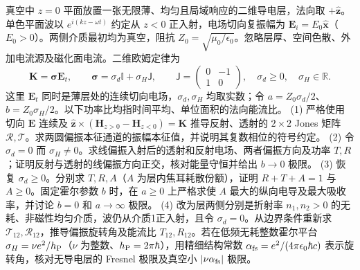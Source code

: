 真空中 \(z=0\) 平面放置一张无限薄、均匀且局域响应的二维导电层，法向取 \(+\hat{\mathbf z}\)。单色平面波以 \(e^{i(kz-\omega t)}\) 约定从 \(z<0\) 正入射，电场切向复振幅为 \(\mathbf E_i=E_0\hat{\mathbf x}\)（\(E_0>0\)）。两侧介质最初均为真空，阻抗 \(Z_0=\sqrt{\mu_0/\epsilon_0}\)。忽略层厚、空间色散、外加电流源及磁化面电流。二维欧姆定律为
\[
\mathbf K=\boldsymbol{\sigma}\mathbf E_t,\qquad
\boldsymbol{\sigma}=\sigma_d\mathbb I+\sigma_H\mathsf J,\qquad
\mathsf J=\begin{pmatrix}0&-1\\1&0\end{pmatrix},\quad
\sigma_d\ge0,\quad\sigma_H\in\mathbb R .
\]
这里 \(\mathbf E_t\) 同时是薄层处的连续切向电场，\(\sigma_d,\sigma_H\) 均取实数；令 \(a=Z_0\sigma_d/2\)、\(b=Z_0\sigma_H/2\)。以下功率比均指时间平均、单位面积的法向能流比。
(1) 严格使用切向 \(\mathbf E\) 连续及 \(\hat{\mathbf z}\times(\mathbf H_{z>0}-\mathbf H_{z<0})=\mathbf K\) 推导反射、透射的 \(2\times2\) Jones 矩阵 \(\mathcal R,\mathcal T\)。求两圆偏振本征通道的振幅本征值，并说明其复数相位的符号约定。
(2) 令 \(\sigma_d=0\) 而 \(\sigma_H\ne0\)。求线偏振入射后的透射和反射电场、两者偏振方向及功率 \(T,R\)；证明反射与透射的线偏振方向正交，核对能量守恒并给出 \(b\to0\) 极限。
(3) 恢复 \(\sigma_d\ge0\)。分别求 \(T,R,A\)（\(A\) 为层内焦耳耗散份额），证明 \(R+T+A=1\) 与 \(A\ge0\)。固定霍尔参数 \(b\) 时，在 \(a\ge0\) 上严格求使 \(A\) 最大的纵向电导及最大吸收率，并讨论 \(b=0\) 和 \(a\to\infty\) 极限。
(4) 改为层两侧分别是折射率 \(n_1,n_2>0\) 的无耗、非磁性均匀介质，波仍从介质1正入射，且令 \(\sigma_d=0\)。从边界条件重新求 \(\mathcal T_{12},\mathcal R_{12}\)，推导偏振旋转角及能流比 \(T_{12},R_{12}\)。若在低频无耗整数霍尔平台 \(\sigma_H=\nu e^2/h_{\rm P}\)（\(\nu\) 为整数、\(h_{\rm P}=2\pi\hbar\)），用精细结构常数 \(\alpha_{\rm fs}=e^2/(4\pi\epsilon_0\hbar c)\) 表示旋转角，核对无导电层的 Fresnel 极限及真空小 \(|\nu\alpha_{\rm fs}|\) 极限。